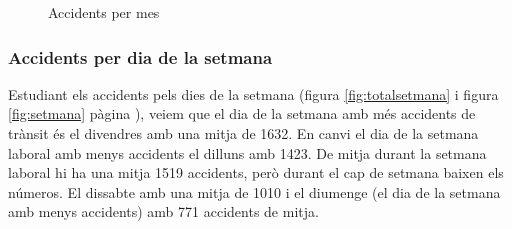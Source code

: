 \begin{figure}[H]
\footnotesize
\centering
{}%
\caption{Accidents per mes}
\label{fig:totalmes}
\end{figure}

\subsubsection*{Accidents per dia de la setmana}

Estudiant els accidents pels dies de la setmana (figura \ref{fig:totalsetmana} i figura \ref{fig:setmana} pàgina \pageref{fig:setmana}), veiem que el dia de la setmana amb més accidents de trànsit és el divendres amb una mitja de 1632. En canvi el dia de la setmana laboral amb menys accidents el dilluns amb 1423. De mitja durant la setmana laboral hi ha una mitja 1519 accidents, però durant el cap de setmana baixen els números. El dissabte amb una mitja de 1010 i el diumenge (el dia de la setmana amb menys accidents) amb 771 accidents de mitja.

